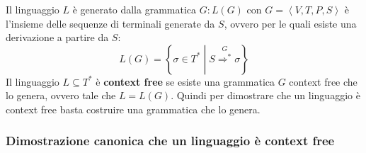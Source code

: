 \documentclass[a4paper]{article}
\begin{document}
\begin{definition}
  Il linguaggio \( L \) è generato dalla grammatica \( G: L(G) \) con \( G = \left<V,T,P,S\right> \)
  è l'insieme delle sequenze di terminali generate da \( S \), ovvero per le quali
  esiste una derivazione a partire da \( S \):
  \[
    L(G) = \left\{ \sigma \in T^* \;\left|\; S \stackrel{G}{\Rightarrow^*}
    \sigma \right. \right\}
  \] 
  Il linguaggio \( L \subseteq T^* \) è \textbf{context free} se esiste una grammatica
  \( G \) context free che lo genera, ovvero tale che \( L = L(G) \). Quindi per dimostrare
  che un linguaggio è context free basta costruire una grammatica che lo genera.
\end{definition}

\subsubsection{Dimostrazione canonica che un linguaggio è context free}
\end{document}
